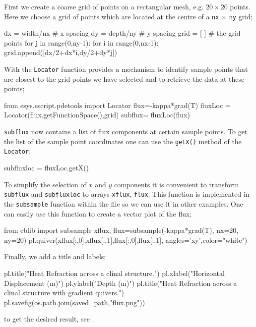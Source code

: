 First we create a coarse grid of points on a rectangular mesh, e.g. $20 \times
20$ points. Here we choose a grid of points which are located at the centre of
a \verb|nx| $\times$ \verb|ny| grid;
\begin{python}
dx = width/nx # x spacing
dy = depth/ny # y spacing
grid = [ ] # the grid points
for j in range(0,ny-1):
    for i in range(0,nx-1):
           grid.append([dx/2+dx*i,dy/2+dy*j])
\end{python}
With the \verb|Locator| function \esc provides a mechanism to identify sample
points that are closest to the grid points we have selected and to retrieve the
data at these points; 
\begin{python}
from esys.escript.pdetools import Locator
flux=-kappa*grad(T)
fluxLoc = Locator(flux.getFunctionSpace(),grid)
subflux= fluxLoc(flux) 
\end{python}
\verb|subflux| now contains a list of flux components at certain sample points.
To get the list of the sample point coordinates one can use the \verb|getX()|
method of the \verb|Locator|;
\begin{python}
subfluxloc = fluxLoc.getX()
\end{python}
To simplify the selection of $x$ and $y$ components it is convenient to
transform \verb|subflux| and \verb|subfluxloc| to \numpy arrays
\verb|xflux|, \verb|flux|.
This function is implemented in the \verb|subsample| function within the
 file so we can use it in other examples. One can easily use this
function to create a vector plot of the flux;
\begin{python}
from cblib import subsample
xflux, flux=subsample(-kappa*grad(T), nx=20, ny=20)
pl.quiver(xflux[:,0],xflux[:,1],flux[:,0],flux[:,1], angles='xy',color="white")
\end{python}
Finally, we add a title and labels;
\begin{python}
pl.title("Heat Refraction across a clinal structure.")
pl.xlabel("Horizontal Displacement (m)")
pl.ylabel("Depth (m)")
pl.title("Heat Refraction across a clinal structure \n with gradient quivers.")
pl.savefig(os.path.join(saved_path,"flux.png"))
\end{python} 
to get the desired result, see .

